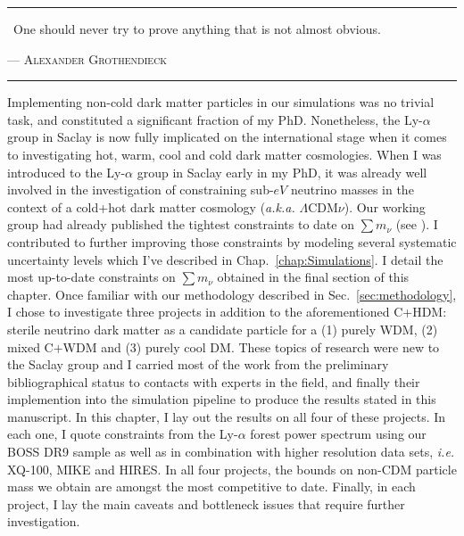 \vspace*{3pc}
\begin{center}
\begin{minipage}{0.7\linewidth}
\hrule
\vspace{8pt}
{\huge\guillemotleft} ~One should never try to prove anything that is not almost obvious. {\huge\guillemotright}  \\
\vspace{2pt}
\begin{flushright}
--- \textsc{Alexander Grothendieck}
\end{flushright}
\vspace{8pt}
\hrule
\end{minipage}
\end{center}
\vspace{3pc}



\begin{intro}
{\color{purple}I}mplementing non-cold dark matter particles in our simulations was no trivial task, and constituted a significant fraction of my PhD. Nonetheless, the Ly-$\alpha$ group in Saclay is now fully implicated on the international stage when it comes to investigating hot, warm, cool and cold dark matter cosmologies. When I was introduced to the Ly-$\alpha$ group in Saclay early in my PhD, it was already well involved in the investigation of constraining sub-$eV$ neutrino masses in the context of a cold+hot dark matter cosmology (\textit{a.k.a.} $\Lambda$CDM$\nu$). Our working group had already published the tightest constraints to date on $\sum m_\nu$ (see \cite{Palanque2015a}). I contributed to further improving those constraints by modeling several systematic uncertainty levels which I've described in Chap.~\ref{chap:Simulations}. I detail the most up-to-date constraints on $\sum m_\nu$ obtained in the final section of this chapter. Once familiar with our methodology described in Sec.~\ref{sec:methodology}, I chose to investigate three projects in addition to the aforementioned C+HDM: sterile neutrino dark matter as a candidate particle for a (1) purely WDM, (2) mixed C+WDM and (3) purely cool DM. These topics of research were new to the Saclay group and I carried most of the work from the preliminary bibliographical status to contacts with experts in the field, and finally their implemention into the simulation pipeline to produce the results stated in this manuscript. In this chapter, I lay out the results on all four of these projects. In each one, I quote constraints from the Ly-$\alpha$ forest power spectrum using our BOSS DR9 sample as well as in combination with higher resolution data sets, \textit{i.e.} XQ-100, MIKE and HIRES. In all four projects, the bounds on non-CDM particle mass we obtain are amongst the most competitive to date. Finally, in each project, I lay the main caveats and bottleneck issues that require further investigation.
\end{intro}

